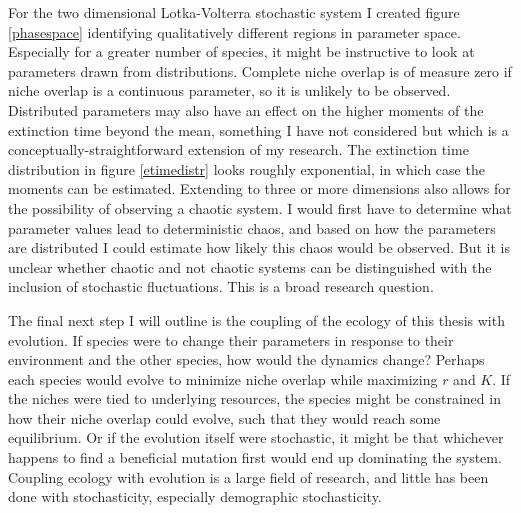 For the two dimensional Lotka-Volterra stochastic system I created figure \ref{phasespace} identifying qualitatively different regions in parameter space. 
Especially for a greater number of species, it might be instructive to look at parameters drawn from distributions. 
Complete niche overlap is of measure zero if niche overlap is a continuous parameter, so it is unlikely to be observed. 
Distributed parameters may also have an effect on the higher moments of the extinction time beyond the mean, something I have not considered but which is a conceptually-straightforward extension of my research. 
The extinction time distribution in figure \ref{etimedistr} looks roughly exponential, in which case the moments can be estimated. 
Extending to three or more dimensions also allows for the possibility of observing a chaotic system. 
I would first have to determine what parameter values lead to deterministic chaos, and based on how the parameters are distributed I could estimate how likely this chaos would be observed.
But it is unclear whether chaotic and not chaotic systems can be distinguished with the inclusion of stochastic fluctuations. 
This is a broad research question. 

The final next step I will outline is the coupling of the ecology of this thesis with evolution. 
If species were to change their parameters in response to their environment and the other species, how would the dynamics change? 
Perhaps each species would evolve to minimize niche overlap while maximizing $r$ and $K$. 
If the niches were tied to underlying resources, the species might be constrained in how their niche overlap could evolve, such that they would reach some equilibrium. 
Or if the evolution itself were stochastic, it might be that whichever happens to find a beneficial mutation first would end up dominating the system. 
Coupling ecology with evolution is a large field of research, and little has been done with stochasticity, especially demographic stochasticity. 


